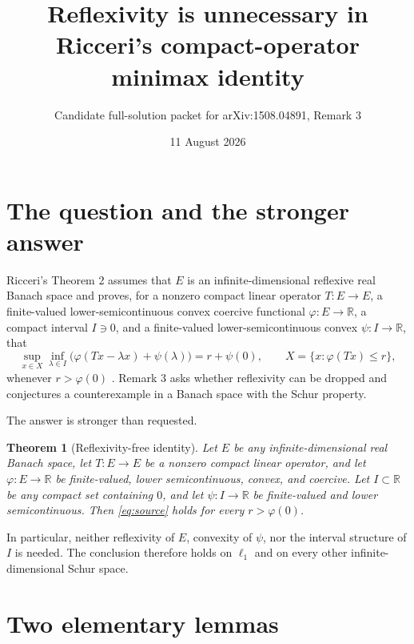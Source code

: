 \documentclass[11pt]{article}
\title{Reflexivity is unnecessary in Ricceri's compact-operator minimax identity}
\author{Candidate full-solution packet for arXiv:1508.04891, Remark 3}
\date{11 August 2026}
\newtheorem{theorem}{Theorem}
\newcommand{\R}{\mathbb R}
\begin{document}
\maketitle

\begin{center}
\end{center}

\section{The question and the stronger answer}

Ricceri's Theorem 2 assumes that $E$ is an infinite-dimensional reflexive
real Banach space and proves, for a nonzero compact linear operator $T:E\to E$,
a finite-valued lower-semicontinuous convex coercive functional
$\varphi:E\to\R$, a compact interval $I\ni0$, and a finite-valued
lower-semicontinuous convex $\psi:I\to\R$, that
\begin{equation}\label{eq:source}
 \sup_{x\in X}\inf_{\lambda\in I}
 \bigl(\varphi(Tx-\lambda x)+\psi(\lambda)\bigr)
 =r+\psi(0),
 \qquad X=\{x:\varphi(Tx)\le r\},
\end{equation}
whenever $r>\varphi(0)$ \cite{source}.  Remark 3 asks whether reflexivity can
be dropped and conjectures a counterexample in a Banach space with the Schur
property.

The answer is stronger than requested.

\begin{theorem}[Reflexivity-free identity]\label{thm:main}
Let $E$ be any infinite-dimensional real Banach space, let $T:E\to E$ be a
nonzero compact linear operator, and let $\varphi:E\to\R$ be finite-valued,
lower semicontinuous, convex, and coercive.  Let $I\subset\R$ be any compact
set containing $0$, and let $\psi:I\to\R$ be finite-valued and lower
semicontinuous.  Then \eqref{eq:source} holds for every $r>\varphi(0)$.
\end{theorem}

In particular, neither reflexivity of $E$, convexity of $\psi$, nor the
interval structure of $I$ is needed.  The conclusion therefore holds on
$\ell_1$ and on every other infinite-dimensional Schur space.

\section{Two elementary lemmas}
\end{document}
